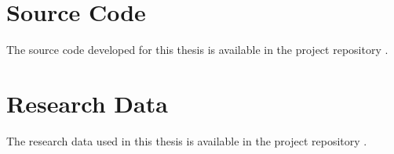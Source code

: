 \chapter{Source Code}

The source code developed for this thesis is available in the project repository \citep{yosafe_timeseries_thesis}.

\chapter{Research Data}

The research data used in this thesis is available in the project repository \citep{yosafe_timeseries_data}.

